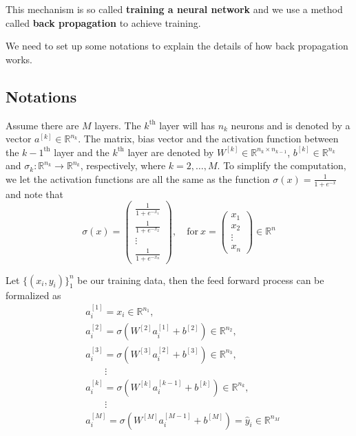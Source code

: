 \documentclass[../main.tex]{subfiles}
\begin{document}
            This mechanism is so called \textbf{training a neural network} and we use a method called \textbf{back propagation} to achieve training.
            
            We need to set up some notations to explain the details of how back propagation works.
            
        \subsection{Notations}
            Assume there are $M$ layers.
            The $k^\mathrm{th}$ layer will has $n_k$ neurons and is denoted by a vector $a^{ [k] }\in \mathbb{R}^{n_k}$.
            The matrix, bias vector and the activation function between the $k-1^{\mathrm{th}}$ layer and the $k^\mathrm{th}$ layer are denoted by $W^{ [k] }\in \mathbb{R}^{ n_k\times n_{k-1} }$, $b^{[k]} \in \mathbb{R}^{n_k}$ and $\sigma_k: \mathbb{R}^{n_k} \rightarrow \mathbb{R}^{n_k}$, respectively, where $k=2,\dots,M$.
            To simplify the computation, we let the activation functions are all the same as the function $\sigma(x) = \frac{1}{1+e^{-x}}$ and note that
            \[
                \sigma(x) = \left( 
                    \begin{array}{c}
                        \frac{1}{1+e^{-x_1}} \\
                        \frac{1}{1+e^{-x_2}} \\
                        \vdots \\
                        \frac{1}{1+e^{-x_n}}                         
                    \end{array}
                \right),\quad\mathrm{for~}x=\left(
                    \begin{array}{c}
                        x_1 \\
                        x_2 \\
                        \vdots \\
                        x_n
                    \end{array}
                \right) \in \mathbb{R}^n
            \]
            
            Let $\{(x_i, y_i)\}_1^n$ be our training data, then the feed forward process can be formalized as 
            \begin{align*}
                & a_i^{ [1] } = x_i \in \mathbb{R}^{n_1}, \\
                & a_i^{ [2] } = \sigma (W^{ [2] }a_i^{ [1] } + b^{ [2] }) \in \mathbb{R}^{n_2}, \\
                & a_i^{ [3] } = \sigma (W^{ [3] }a_i^{ [2] } + b^{ [3] }) \in \mathbb{R}^{n_3}, \\
                & \qquad\vdots\\
                & a_i^{ [k] } = \sigma (W^{ [k] } a_i^{ [k-1] } + b^{ [k] }) \in \mathbb{R}^{n_k}, \\
                & \qquad\vdots\\
                & a_i^{ [M] } = \sigma (W^{ [M] } a_i^{ [M-1] } + b^{ [M] })=\hat{y}_i \in \mathbb{R}^{n_M}
            \end{align*}
            
\end{document}
